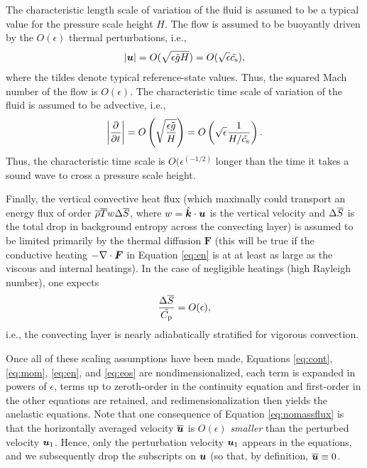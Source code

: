 \documentclass[12pt]{article}
\newcommand{\vecf}{\bm{F}}
\newcommand{\veck}{\hat{\bm{k}}}
\begin{document}
	The characteristic length scale of variation of the fluid is assumed to be a typical value for the pressure scale height $H$. The flow is assumed to be buoyantly driven by the $O(\epsilon)$ thermal perturbations, i.e., 
	\begin{align}\label{eq:scaleu}
		|\bm{u}| = O(\sqrt{\epsilon \tilde{g} H}) = O(\sqrt{\epsilon}\tilde{c_{\rm s}}),
	\end{align}
	where the tildes denote typical reference-state values. Thus, the squared Mach number of the flow is $O(\epsilon)$. The characteristic time scale of variation of the fluid is assumed to be advective, i.e., 
	\begin{align}\label{eq:scaleu}
	\left|\frac{\partial}{\partial t}\right| = O\left(\sqrt{\frac{\epsilon \tilde{g}}{H}}\right) = O\left(\sqrt{\epsilon} \frac{1}{H/\tilde{c_{\rm s}}}\right).
	\end{align}
	Thus, the characteristic time scale is $O(\epsilon^(-1/2)$ longer than the time it takes a sound wave to cross a pressure scale height. 
	
	Finally, the vertical convective heat flux (which maximally could transport an energy flux of order $\overline{\rho} \overline{T} w \Delta\overline{S}$, where $w=\veck\cdot\vecu$ is the vertical velocity and $\Delta \overline{S} $ is the total drop in background entropy across the convecting layer) is assumed to be limited primarily by the thermal diffusion $\vecf$ (this will be true if the conductive heating $-\Div \vecf$ in Equation \eqref{eq:en} is at at least as large as the viscous and internal heatings). In the case of negligible heatings (high Rayleigh number), one expects
	\begin{align}
		\frac{\Delta\overline{S}}{\tilde{C_{\rm{p}}}} = O(\epsilon),
	\end{align}
	i.e., the convecting layer is nearly adiabatically stratified for vigorous convection. 
	
	Once all of these scaling assumptions have been made, Equations \eqref{eq:cont}, \eqref{eq:mom}, \eqref{eq:en}, and \eqref{eq:eos} are nondimensionalized, each term is expanded in powers of $\epsilon$, terms up to zeroth-order in the continuity equation and first-order in the other equations are retained, and redimensionalization then yields the anelastic equations. Note that one consequence of Equation \eqref{eq:nomassflux} is that the horizontally averaged velocity $\overline{\bm{u}}$ is $O(\epsilon)$ \textit{smaller} than the perturbed velocity $\bm{u}_1$. Hence, only the perturbation velocity $\bm{u}_1$ appears in the equations, and we subsequently drop the subscripts on $\bm{u}$ (so that, by definition, $\overline{\bm{u}}\equiv0$. 
	
\end{document}
